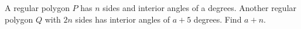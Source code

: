 A regular polygon $P$ has $n$ sides and interior angles of a degrees. Another regular polygon $Q$ with $2n$ sides has interior angles of $a + 5$ degrees. Find $a + n$.

